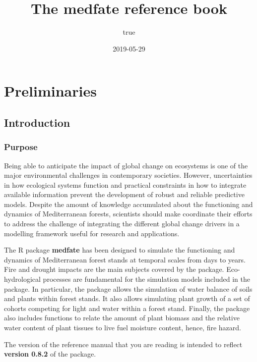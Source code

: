 \documentclass[]{book}
\title{The medfate reference book}
\author{true}
\date{2019-05-29}
\begin{document}
\maketitle

{
\setcounter{tocdepth}{1}
\tableofcontents
}
\hypertarget{part-preliminaries}{%
\part{Preliminaries}\label{part-preliminaries}}

\hypertarget{intro}{%
\chapter{Introduction}\label{intro}}

\hypertarget{purpose}{%
\section{Purpose}\label{purpose}}

Being able to anticipate the impact of global change on ecosystems is one of the major environmental challenges in contemporary societies. However, uncertainties in how ecological systems function and practical constraints in how to integrate available information prevent the development of robust and reliable predictive models. Despite the amount of knowledge accumulated about the functioning and dynamics of Mediterranean forests, scientists should make coordinate their efforts to address the challenge of integrating the different global change drivers in a modelling framework useful for research and applications.

The R package \textbf{medfate} has been designed to simulate the functioning and dynamics of Mediterranean forest stands at temporal scales from days to years. Fire and drought impacts are the main subjects covered by the package. Eco-hydrological processes are fundamental for the simulation models included in the package. In particular, the package allows the simulation of water balance of soils and plants within forest stands. It also allows simulating plant growth of a set of cohorts competing for light and water within a forest stand. Finally, the package also includes functions to relate the amount of plant biomass and the relative water content of plant tissues to live fuel moisture content, hence, fire hazard.

The version of the reference manual that you are reading is intended to reflect \textbf{version 0.8.2} of the package.
\end{document}
